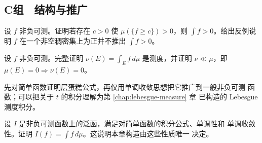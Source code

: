 \subsection*{C组　结构与推广}
\begin{enumerate}[label=\textbf{\thechapter.\arabic*.},resume]
设 \(f\) 非负可测。证明若存在 \(c>0\) 使
\(\mu(\{f\ge c\})>0\)，则 \(\int f>0\)。给出反例说明
\(f\) 在一个非空稠密集上为正并不推出 \(\int f>0\)。

设 \(f\) 非负可测。完整证明 \(\nu(E)=\int_Ef\,d\mu\) 是测度，并证明
\(\nu\ll\mu\)，即 \(\mu(E)=0\Rightarrow\nu(E)=0\)。

先对简单函数证明层蛋糕公式，再仅用单调收敛思想把它推广到一般非负可测
函数；可以把关于 \(t\) 的积分理解为第 \ref{chap:lebesgue-measure} 章
已构造的 Lebesgue 测度积分。

设 \(I\) 是非负可测函数上的泛函，满足对简单函数的积分公式、单调性和
单调收敛性。证明 \(I(f)=\int f\,d\mu\)。这说明本章构造由这些性质唯一
决定。
\end{enumerate}
